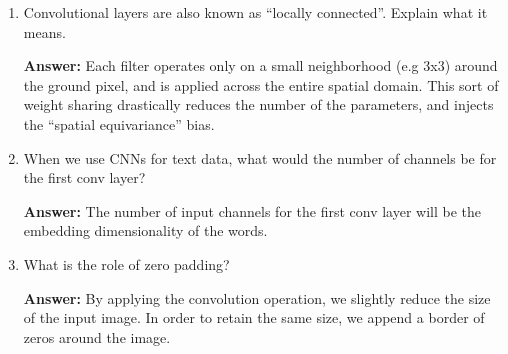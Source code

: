 \documentclass{article}
\newenvironment{QandA}{\begin{enumerate}[label=\arabic*.]}{\end{enumerate}}
\newenvironment{InnerQandA}{\begin{enumerate}[label=\roman*.]}{\end{enumerate}}
\newenvironment{answer}{\par\normalfont \textbf{Answer:}}{}
\begin{document}
\begin{QandA}
\begin{InnerQandA}
        \item How do you choose the ideal filter size?
        \begin{answer}
            First of all, even-sized filters are not typical used because they break the symmetry around the neuron we are computing the local features for. Since 1x1 filters are too noisy and don't capture local dependencies, and 5x5 filters are rather computationally expensive, it has been empirically shown that 3x3 filters combine the best of both worlds: low computation cost and high accuracy.
        \end{answer}
    \end{InnerQandA}

    \item Convolutional layers are also known as ``locally connected''. Explain what it means.
    \begin{answer}
        Each filter operates only on a small neighborhood (e.g 3x3) around the ground pixel, and is applied across the entire spatial domain. This sort of weight sharing drastically reduces the number of the parameters, and injects the ``spatial equivariance'' bias.
    \end{answer}

    \item When we use CNNs for text data, what would the number of channels be for the first conv layer?
    \begin{answer}
        The number of input channels for the first conv layer will be the embedding dimensionality of the words.
    \end{answer}

    \item What is the role of zero padding?
    \begin{answer}
        By applying the convolution operation, we slightly reduce the size of the input image. In order to retain the same size, we append a border of zeros around the image.
    \end{answer}


\end{QandA}
\end{document}

